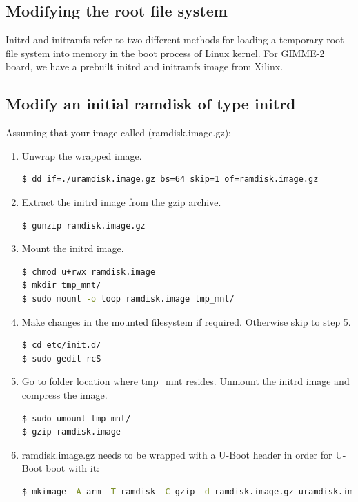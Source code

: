 \subsection{Modifying the root file system} 
\label{Modifying_the_root_file_system}
Initrd and initramfs refer to two different methods for loading a temporary root file system into memory in the boot process of Linux kernel. For GIMME-2 board, we have a prebuilt initrd and initramfs image from Xilinx\cite{xilinxwiki}.

\subsection{Modify an initial ramdisk of type initrd}
Assuming that your image called (ramdisk.image.gz): 
\begin{enumerate}
\item Unwrap the wrapped image.
\begin{lstlisting}[language=bash]
$ dd if=./uramdisk.image.gz bs=64 skip=1 of=ramdisk.image.gz 
\end{lstlisting}
\item Extract the initrd image from the gzip archive.
\begin{lstlisting}[language=bash]
$ gunzip ramdisk.image.gz 
\end{lstlisting}
\item Mount the initrd image.
\begin{lstlisting}[language=bash]
$ chmod u+rwx ramdisk.image 
$ mkdir tmp_mnt/ 
$ sudo mount -o loop ramdisk.image tmp_mnt/ 
\end{lstlisting}
\item Make changes in the mounted filesystem if required. Otherwise skip to step 5.
\begin{lstlisting}[language=bash]
$ cd etc/init.d/ 
$ sudo gedit rcS 
\end{lstlisting}
\item Go to folder location where tmp\_mnt resides. Unmount the initrd image and compress the image.
\begin{lstlisting}[language=bash]
$ sudo umount tmp_mnt/ 
$ gzip ramdisk.image 
\end{lstlisting}
\item ramdisk.image.gz needs to be wrapped with a U-Boot header in order for U-Boot boot with it:
\begin{lstlisting}[language=bash]
$ mkimage -A arm -T ramdisk -C gzip -d ramdisk.image.gz uramdisk.image.gz.
\end{lstlisting}
\end{enumerate}
